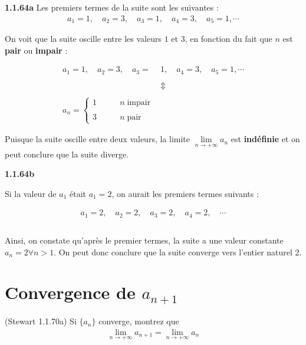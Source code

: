 \documentclass{report}
\begin{document}
    \noindent \textbf{1.1.64a}  Les premiers termes de la suite sont les suivantes :
    \begin{align*}
        a_1 = 1, \quad a_2 = 3, \quad a_3 = 1, \quad a_4 = 3, \quad a_5 = 1, \cdots
    \end{align*}

    On voit que la suite oscille entre les valeurs $1$ et $3$, en fonction du fait que $n$ est 
    \textbf{pair} ou \textbf{impair} :                  

    \begin{align*}
        a_1 = 1, \quad a_2 = 3, \quad a_3 = &1, \quad a_4 = 3, \quad a_5 = 1, \cdots \\ \\
                                                     &\Updownarrow \\\\
        a_n = 
        \begin{cases} 
            1 & \quad \quad n \; \text{impair} \\ \\
            3 & \quad \quad n \; \text{pair}
        \end{cases}
    \end{align*}
    

    Puisque la suite oscille entre deux valeurs, la limite $\lim\limits_{n \to+\infty }a_n$ est \textbf{indéfinie}                    et on peut conclure que la suite diverge.
    \vspace{1em}%

    \noindent \textbf{1.1.64b}

    Si la valeur de $a_1$ était $a_1 = 2$, on aurait les premiers termes suivants : 
    
    \begin{align*}
        a_1 = 2, \quad a_2 = 2, \quad a_3 = 2, \quad a_4 = 2, \quad \cdots \\ \\
    \end{align*}

    Ainsi, on constate qu'après le premier termes, la suite a une valeur constante $a_n = 2 \forall n > 1$. On 
    peut donc conclure que la suite converge vers l'entier naturel 2.


    \section{Convergence de \(a_{n+1} \)}

    \begin{Exercice}{(Stewart 1.1.70a)}{}
        Si $\{a_n \}$ converge, montrez que  
        \begin{align*}
            \lim\limits_{n \to+\infty }a_{n+1} = \lim\limits_{n \to+\infty } a_n  
        \end{align*}
    \end{Exercice}
\end{document}
